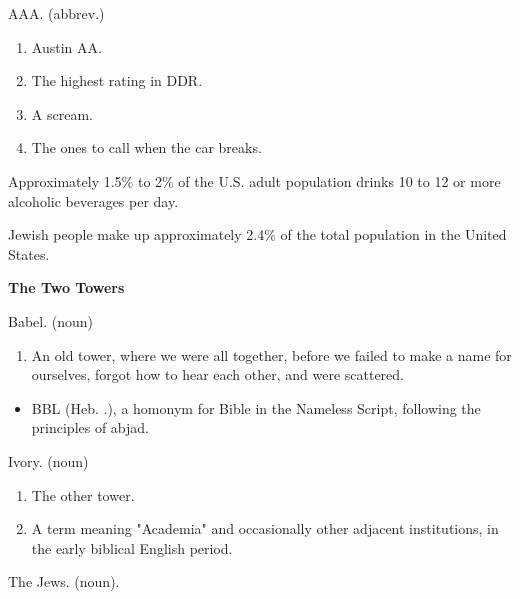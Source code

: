 
\Sentence
{ \hX{} }
{ \eX{} }
{
AAA. (abbrev.)
\begin{enumerate}
\item Austin AA.
\item The highest rating in DDR.
\item A scream.
\item The ones to call when the car breaks.
\end{enumerate}
}

\Sentence
{ \hX{} }
{ \eX{} }
{
Approximately 1.5\% to 2\% of the U.S. adult population drinks 10 to 12 or more alcoholic beverages per day.
}

\Sentence
{ \hX{} }
{ \eX{} }
{
Jewish people make up approximately 2.4\% of the total population in the United States.
}

\Sentence
{ \hX{} }
{ \eX{} }
{ \textbf{The Two Towers} }

\Sentence
{ \hX{} }
{ \eX{} }
{
Babel. (noun)
\begin{enumerate}
\item An old tower, where we were all together, before we failed to make a name for ourselves, forgot how to hear each other, and were scattered.
\end{enumerate}
\begin{itemize}
\item BBL (Heb. .), a homonym for Bible in the Nameless Script, following the principles of abjad.
\end{itemize}
}

\Sentence
{ \hX{} }
{ \eX{} }
{
Ivory. (noun)
\begin{enumerate}
\item The other tower.
\item A term meaning "Academia" and occasionally other adjacent institutions, in the early biblical English period.
\end{enumerate}
}

\Sentence
{ \hX{} }
{ \eX{} }
{
The Jews. (noun).
}

